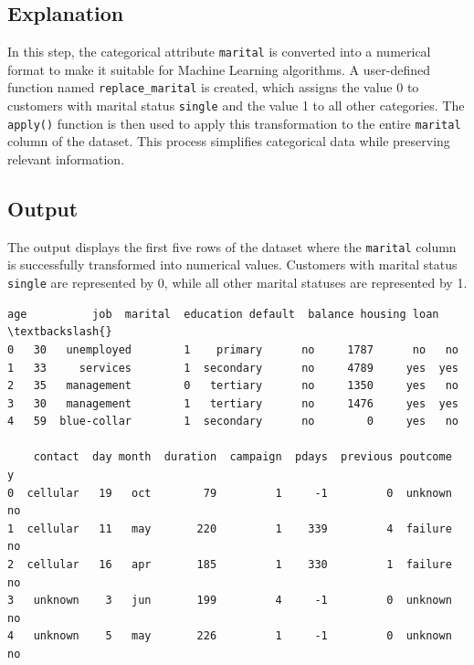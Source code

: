 \documentclass[11pt,a4paper]{report}
\makeatletter
\newcommand{\boxspacing}{\kern\kvtcb@left@rule\kern\kvtcb@boxsep}
\newcommand{\prompt}[4]{
        {\ttfamily\llap{{\color{#2}[#3]:\hspace{3pt}#4}}\vspace{-\baselineskip}}
    }
\makeatother
\begin{document}
\subsection*{Explanation}
In this step, the categorical attribute \texttt{marital} is converted into a numerical format to make it suitable for Machine Learning algorithms. A user-defined function named \texttt{replace\_marital} is created, which assigns the value 0 to customers with marital status \texttt{single} and the value 1 to all other categories. The \texttt{apply()} function is then used to apply this transformation to the entire \texttt{marital} column of the dataset. This process simplifies categorical data while preserving relevant information.

\subsection*{Output}
The output displays the first five rows of the dataset where the \texttt{marital} column is successfully transformed into numerical values. Customers with marital status \texttt{single} are represented by 0, while all other marital statuses are represented by 1.
            \begin{tcolorbox}[breakable, size=fbox, boxrule=.5pt, pad at break*=1mm, opacityfill=0]
\prompt{Out}{outcolor}{5}{\boxspacing}
\begin{Verbatim}[commandchars=\\\{\}]
   age          job  marital  education default  balance housing loan  \textbackslash{}
0   30   unemployed        1    primary      no     1787      no   no
1   33     services        1  secondary      no     4789     yes  yes
2   35   management        0   tertiary      no     1350     yes   no
3   30   management        1   tertiary      no     1476     yes  yes
4   59  blue-collar        1  secondary      no        0     yes   no

    contact  day month  duration  campaign  pdays  previous poutcome   y
0  cellular   19   oct        79         1     -1         0  unknown  no
1  cellular   11   may       220         1    339         4  failure  no
2  cellular   16   apr       185         1    330         1  failure  no
3   unknown    3   jun       199         4     -1         0  unknown  no
4   unknown    5   may       226         1     -1         0  unknown  no
\end{Verbatim}
\end{tcolorbox}
        
\end{document}
